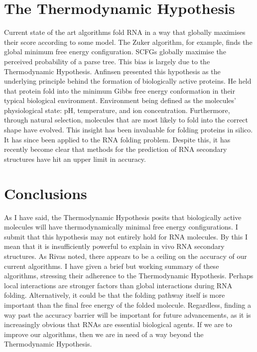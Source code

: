 \documentclass[12pt, a4paper]{article}
\begin{document}
\section{The Thermodynamic Hypothesis}
Current state of the art algorithms fold RNA in a way that globally maximises their score according to some model. The Zuker algorithm, for example, finds the global minimum free energy configuration. SCFGs globally maximise the perceived probability of a parse tree. This bias is largely due to the Thermodynamic Hypothesis. Anfinsen \cite{anfinsen1973principles} presented this hypothesis as the underlying principle behind the formation of biologically active proteins. He held that protein fold into the minimum Gibbs free energy conformation in their typical biological environment. Environment being defined as the molecules' physiological state: pH, temperature, and ion concentration. Furthermore, through natural selection, molecules that are most likely to fold into the correct shape have evolved. This insight has been invaluable for folding proteins in silico. It has since been applied to the RNA folding problem. Despite this, it has recently become clear that methods for the prediction of RNA secondary structures have hit an upper limit in accuracy.


\section{Conclusions}

As I have said, the Thermodynamic Hypothesis posits that biologically active molecules will have thermodynamically minimal free energy configurations. I submit that this hypothesis may not entirely hold for RNA molecules. By this I mean that it is insufficiently powerful to explain in vivo RNA secondary structures. As Rivas \cite{rivas2013four} noted, there appears to be a ceiling on the accuracy of our current algorithms. I have given a brief but working summary of these algorithms, stressing their adherence to the Thermodynamic Hypothesis. Perhaps local interactions are stronger factors than global interactions during RNA folding. Alternatively, it could be that the folding pathway itself is more important than the final free energy of the folded molecule. Regardless, finding a way past the accuracy barrier will be important for future advancements, as it is increasingly obvious that RNAs are essential biological agents. If we are to improve our algorithms, then we are in need of a way beyond the Thermodynamic Hypothesis.







\end{document}
